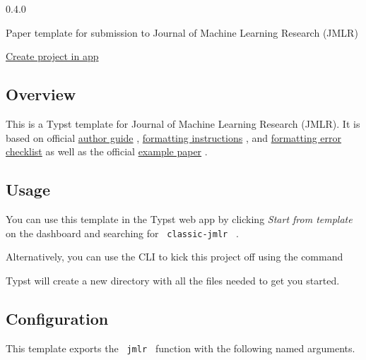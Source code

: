 { 0.4.0 }

Paper template for submission to Journal of Machine Learning Research
(JMLR)

\href{/app?template=classic-jmlr&version=0.4.0}{Create project in app}

\label{readme}
\subsection{Overview}\label{overview}

This is a Typst template for Journal of Machine Learning Research
(JMLR). It is based on official
\href{https://www.jmlr.org/format/authors-guide.html}{author guide} ,
\href{https://www.jmlr.org/format/format.html}{formatting instructions}
, and
\href{https://www.jmlr.org/format/formatting-errors.html}{formatting
error checklist} as well as the official
\href{https://github.com/jmlrorg/jmlr-style-file}{example paper} .

\subsection{Usage}\label{usage}

You can use this template in the Typst web app by clicking \emph{Start
from template} on the dashboard and searching for
\texttt{\ classic-jmlr\ } .

Alternatively, you can use the CLI to kick this project off using the
command

\begin{Shaded}
\begin{Highlighting}[]
\end{Highlighting}
\end{Shaded}

Typst will create a new directory with all the files needed to get you
started.

\subsection{Configuration}\label{configuration}

This template exports the \texttt{\ jmlr\ } function with the following
named arguments.

